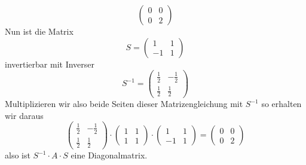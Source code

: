 \begin{beispiel}
$$  	\left( \begin{matrix} 0 & 0 \\ 0 & 2 \end{matrix} \right) $$
Nun ist die Matrix
  	$$ S = \left( \begin{matrix} 1 & 1 \\ -1 & 1 \end{matrix} \right) $$
invertierbar mit Inverser
  	$$ S^{-1} = \left( \begin{matrix} \frac {1}{2} & - \frac {1}{2} \\ 
  	\frac {1}{2} & \frac {1}{2} \end{matrix} \right) $$
Multiplizieren wir also beide Seiten dieser Matrizengleichung mit $S^{-1}$ so erhalten 
wir daraus
  	$$ \left( \begin{matrix} \frac {1}{2} & - \frac {1}{2} \\ 
  	\frac {1}{2} & \frac {1}{2} \end{matrix} \right) \cdot 
 	\left( \begin{matrix} 1 & 1 \\ 1 & 1 \end{matrix} \right) \cdot
  	\left( \begin{matrix} 1 & 1 \\ -1 & 1 \end{matrix} \right) = 
  	\left( \begin{matrix} 0 & 0 \\ 0 & 2 \end{matrix} \right) $$
also ist $S^{-1} \cdot A \cdot S$ eine Diagonalmatrix.
\end{beispiel}

